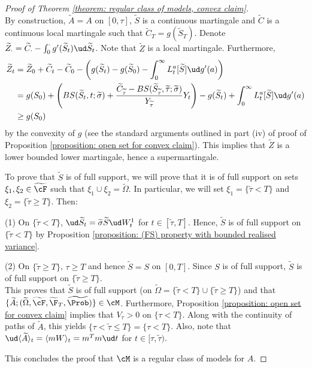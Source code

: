\documentclass[11pt]{article}
\begin{document}
\begin{proof}[Proof of Theorem \ref{theorem: regular class of models, convex claim}]
$$$$
By construction, $\widetilde{A} = A$ on $[0,\tau]$, $\widetilde{S}$ is a continuous martingale and $\widetilde{C}$ is a continuous local martingale such that $\widetilde{C}_T = g(\widetilde{S}_T)$. Denote $\widetilde{Z}_\cdot = \widetilde{C}_\cdot - \int_0^\cdot g^\prime(\widetilde{S}_t) \ud \widetilde{S}_t$. Note that $\widetilde{Z}$ is a local martingale. Furthermore,
\begin{align*}
\widetilde{Z}_t &= \widetilde{Z}_0 + \widetilde{C}_t - \widetilde{C}_0 - \left( g(\widetilde{S}_t) - g(\widetilde{S}_0) - \int_0^\infty L^a_t[\widetilde S] \ud g^\prime(a) \right)  \\
&= g(S_0) + \left( BS(\widetilde{S}_t, t; \widetilde{\sigma}) + \frac{\widetilde{C}_{\widetilde{\tau}} - BS(\widetilde{S}_{\widetilde{\tau}}, \widetilde{\tau}; \widetilde{\sigma})}{Y_{\widetilde{\tau}}} Y_t \right) - g(\widetilde{S}_t) + \int_0^\infty L^a_t[\widetilde S] \ud g^\prime(a) \\
& \geq g(S_0)
\end{align*}
by the convexity of $g$ (see the standard arguments outlined in part (iv) of proof of Proposition \ref{proposition: open set for convex claim}). This implies that $\widetilde{Z}$ is a lower bounded lower martingale, hence a supermartingale.

To prove that $\widetilde{S}$ is of full support, we will prove that it is of full support on sets $\xi_1, \xi_2 \in \widetilde{\cF}$ such that $\xi_1 \cup \xi_2 = \widetilde{\Omega}$. In particular, we will set $\xi_1 = \{ \widetilde{\tau} < T \}$ and $\xi_2  = \{ \widetilde{\tau} \geq T \}$. Then:
\item (1)  On $\{ \widetilde{\tau} < T \}$, $\ud \widetilde{S}_t = \widetilde{\sigma} \widetilde{S} \ud W^1_t$ for $t \in [\widetilde{\tau},T]$. Hence, $\widetilde{S}$ is of full support on $\{ \widetilde{\tau} < T \}$ by Proposition \ref{proposition: (FS) property with bounded realised variance}.
\item (2) On $\{ \widetilde{\tau} \geq T \}$, $\tau \geq T$ and hence $\widetilde{S} = S$ on $[0,T]$. Since $S$ is of full support, $\widetilde{S}$ is of full support on $\{ \widetilde{\tau} \geq T \}$. \\
This proves that $\widetilde{S}$ is of full support (on $\widetilde{\Omega} = \{ \widetilde{\tau} < T \} \cup \{ \widetilde{\tau} \geq T \}$) and that $\{ \widetilde{A}; (\widetilde{\Omega},\widetilde{\cF},\widetilde{\F}_T,\widetilde{\Prob}) \} \in \cM$. Furthermore, Proposition \ref{proposition: open set for convex claim} implies that $V_\tau > 0$ on $\{\tau < T\}$. Along with the continuity of paths of $\widetilde{A}$, this yields $\{\tau < \widetilde{\tau} \leq T \} = \{ \tau < T \}$. Also, note that $\ud \langle \widetilde{A} \rangle_t = \langle mW \rangle_t = m^T m \ud t$ for $t \in [\tau, \widetilde{\tau})$.

This concludes the proof that $\cM$ is a regular class of models for $A$.

\end{proof}
\end{document}
